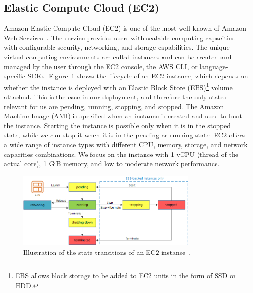 \subsection{Elastic Compute Cloud (EC2)}
\label{subsec:ec2}
Amazon Elastic Compute Cloud (EC2) is one of the most well-known of Amazon Web Services~\cite{noauthor_secure_nodate}. The service provides users with scalable computing capacities with configurable security, networking, and storage capabilities. The unique virtual computing environments are called instances and can be created and managed by the user through the EC2 console, the AWS CLI, or language-specific SDKs. Figure~\ref{fig:ec2_lifecycle} shows the lifecycle of an EC2 instance, which depends on whether the instance is deployed with an Elastic Block Store (EBS)\footnote{EBS allows block storage to be added to EC2 units in the form of SSD or HDD.} volume attached. This is the case in our deployment, and therefore the only states relevant for us are pending, running, stopping, and stopped. The Amazon Machine Image (AMI) is specified when an instance is created and used to boot the instance. Starting the instance is possible only when it is in the stopped state, while we can stop it when it is in the pending or running state. EC2 offers a wide range of instance types with different CPU, memory, storage, and network capacities combinations. We focus on the  instance with 1 vCPU (thread of the actual core), 1 GiB memory, and low to moderate network performance.

\begin{figure}[ht!]
  \begin{center}
      \includegraphics[width=0.8\textwidth]{figures/ec2_instance_lifecycle.png}
      \caption{Illustration of the state transitions of an EC2 instance~\cite{noauthor_instance_nodate}.}
      \label{fig:ec2_lifecycle}
  \end{center}
\end{figure}

